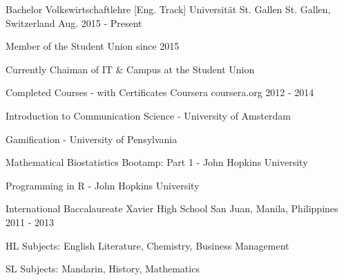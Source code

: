 \begin{cventries}

  \cventry
    {Bachelor Volkswirtschaftlehre [Eng. Track]} %
    {Universität St. Gallen} %
    {St. Gallen, Switzerland} %
    {Aug. 2015 - Present} %
    {} %
    {
      \begin{cvitems} %
        \item {Member of the Student Union since 2015}
        \item {Currently Chaiman of IT \& Campus at the Student Union}
      \end{cvitems}
    }

  \cventry
  {Completed Courses - with Certificates} %
  {Coursera} %
  {coursera.org} %
  {2012 - 2014} %
  {} %
  {
    \begin{cvitems} %
        \item {Introduction to Communication Science - University of Amsterdam}
        \item {Gamification - University of Pensylvania}
        \item {Mathematical Biostatistics Bootamp: Part 1 - John Hopkins University}
        \item {Programming in R - John Hopkins University}
    \end{cvitems}
  }

  \cventry
    {International Baccalaureate} %
    {Xavier High School} %
    {San Juan, Manila, Philippines} %
    {2011 - 2013} %
    {} %
    {
      \begin{cvitems} %
        \item {HL Subjects: English Literature, Chemistry, Business Management }
        \item {SL Subjects: Mandarin, History, Mathematics }
      \end{cvitems}
    }

\end{cventries}
